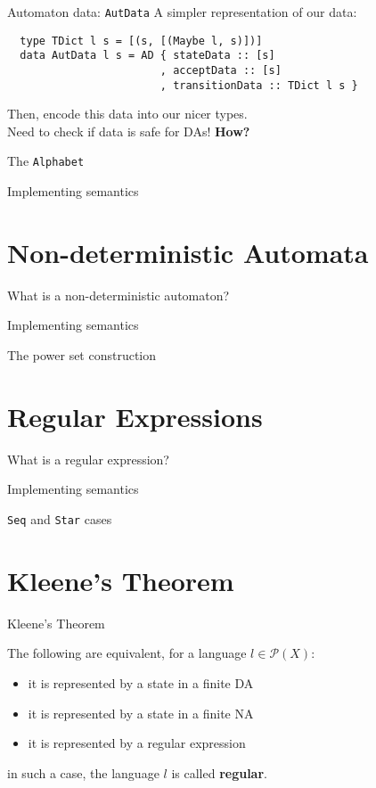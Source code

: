 \documentclass{beamer}
\begin{document}
\begin{frame}[fragile]{Automaton data: \texttt{AutData}}
  A simpler representation of our data:
  \begin{verbatim}
  type TDict l s = [(s, [(Maybe l, s)])]
  data AutData l s = AD { stateData :: [s] 
                        , acceptData :: [s] 
                        , transitionData :: TDict l s }
  \end{verbatim}
  Then, encode this data into our nicer types. \\ \pause
  Need to check if data is safe for DAs! \textbf{How?}
\end{frame}
\begin{frame}{The \texttt{Alphabet}}
\end{frame}
\begin{frame}{Implementing semantics}
\end{frame}

\section{Non-deterministic Automata}
\begin{frame}{What is a non-deterministic automaton?}
\end{frame}
\begin{frame}{Implementing semantics}
\end{frame}
\begin{frame}{The power set construction}
\end{frame}

\section{Regular Expressions}
\begin{frame}{What is a regular expression?}
\end{frame}
\begin{frame}{Implementing semantics}
\end{frame}
\begin{frame}{\texttt{Seq} and \texttt{Star} cases}
\end{frame}

\section{Kleene's Theorem}
\begin{frame}{Kleene's Theorem}
  \begin{theorem}
    The following are equivalent, for a language $l \in \mathcal{P}(X)$:
    \begin{itemize}
      \item it is represented by a state in a finite DA\pause
      \item it is represented by a state in a finite NA\pause
      \item it is represented by a regular expression\pause
    \end{itemize}
    in such a case, the language $l$ is called \textbf{regular}.
  \end{theorem}
\end{frame}
\end{document}
